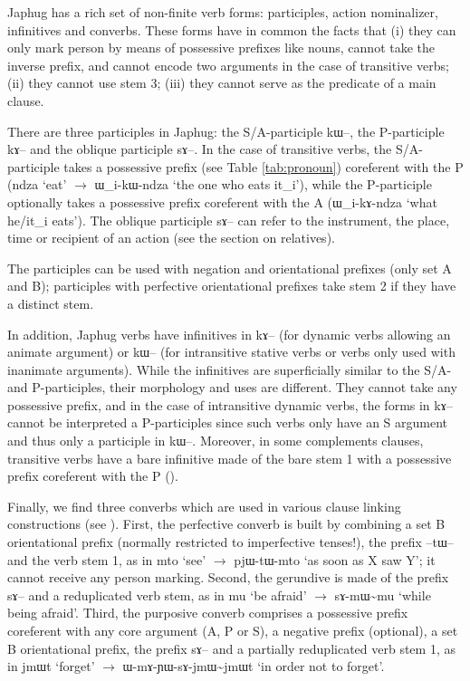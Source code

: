 \documentclass[oldfontcommands,oneside,a4paper,11pt]{article}
\newcommand{\ipa}[1]{{\phon#1}} %
\begin{document}
Japhug has a rich set of non-finite verb forms: participles, action nominalizer, infinitives and converbs. These forms have in common the facts that (i) they can only mark person by means of possessive prefixes like nouns, cannot take the inverse prefix, and cannot encode two arguments in the case of transitive verbs; (ii) they cannot use stem 3; (iii) they cannot serve as the predicate of a main clause.

There are three participles in Japhug: the S/A-participle \ipa{kɯ--}, the P-participle \ipa{kɤ--} and the oblique participle \ipa{sɤ--}. In the case of transitive verbs, the S/A-participle takes a possessive prefix (see Table \ref{tab:pronoun}) coreferent with the P (\ipa{ndza} `eat' $\rightarrow$ \ipa{ɯ_i-kɯ-ndza} `the one who eats it_i'), while the P-participle optionally takes a possessive prefix coreferent with the A (\ipa{ɯ_i-kɤ-ndza} `what he/it_i eats'). The oblique participle \ipa{sɤ--} can refer to  the instrument, the place, time or recipient of an action (see the section on relatives).

The participles can be used with negation and orientational prefixes (only set A and B); participles with perfective orientational prefixes take stem 2 if they have a distinct stem.

In addition, Japhug verbs have infinitives in \ipa{kɤ--} (for dynamic verbs allowing an animate argument) or \ipa{kɯ--} (for intransitive stative verbs or verbs only used with inanimate arguments). While the infinitives are superficially similar to the S/A- and P-participles, their morphology and uses are different. They cannot take any possessive prefix, and in the case of intransitive dynamic verbs, the forms in \ipa{kɤ--} cannot be interpreted a P-participles since such verbs only have an S argument and thus only a participle in \ipa{kɯ--}. Moreover, in some complements clauses, transitive verbs have a bare infinitive made of the bare stem 1 with a possessive prefix coreferent with the P (\citealt{jacques14antipassive}).

Finally, we find three converbs which are used in various clause linking constructions (see \citealt{jacques14linking}). First, the perfective converb is built by combining a set B orientational prefix (normally restricted to imperfective tenses!),  the prefix \ipa{--tɯ--} and the verb stem 1, as in \ipa{mto} `see' $\rightarrow$ \ipa{pjɯ-tɯ-mto} `as soon as X saw Y'; it cannot receive any person marking. Second, the gerundive is made of the prefix \ipa{sɤ--} and a reduplicated verb stem, as in \ipa{mu} `be afraid' $\rightarrow$ \ipa{sɤ-mɯ\textasciitilde{}mu} `while being afraid'. Third, the purposive converb comprises a possessive prefix coreferent with any core argument (A, P or S), a negative prefix (optional), a set B orientational prefix, the prefix \ipa{sɤ--} and a partially reduplicated verb stem 1, as in \ipa{jmɯt} `forget' $\rightarrow$ \ipa{ɯ-mɤ-ɲɯ-sɤ-jmɯ\textasciitilde{}jmɯt} `in order not to forget'.
\end{document}
